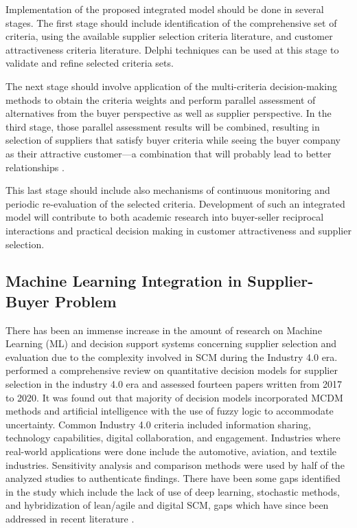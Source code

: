 \documentclass[11pt]{article}
\begin{document}
Implementation of the proposed integrated model should be done in several stages. The first stage should include identification of the comprehensive set of criteria, using the available supplier selection criteria literature, and customer attractiveness criteria literature. Delphi techniques can be used at this stage to validate and refine selected criteria sets.

The next stage should involve application of the multi-criteria decision-making methods to obtain the criteria weights and perform parallel assessment of alternatives from the buyer perspective as well as supplier perspective. In the third stage, those parallel assessment results will be combined, resulting in selection of suppliers that satisfy buyer criteria while seeing the buyer company as their attractive customer---a combination that will probably lead to better relationships \cite{ref14}.

This last stage should include also mechanisms of continuous monitoring and periodic re-evaluation of the selected criteria. Development of such an integrated model will contribute to both academic research into buyer-seller reciprocal interactions and practical decision making in customer attractiveness and supplier selection.

\subsection{Machine Learning Integration in Supplier-Buyer Problem}

There has been an immense increase in the amount of research on Machine Learning (ML) and decision support systems concerning supplier selection and evaluation due to the complexity involved in SCM during the Industry 4.0 era. \cite{ref37} performed a comprehensive review on quantitative decision models for supplier selection in the industry 4.0 era and assessed fourteen papers written from 2017 to 2020. It was found out that majority of decision models incorporated MCDM methods and artificial intelligence with the use of fuzzy logic to accommodate uncertainty. Common Industry 4.0 criteria included information sharing, technology capabilities, digital collaboration, and engagement. Industries where real-world applications were done include the automotive, aviation, and textile industries. Sensitivity analysis and comparison methods were used by half of the analyzed studies to authenticate findings. There have been some gaps identified in the study which include the lack of use of deep learning, stochastic methods, and hybridization of lean/agile and digital SCM, gaps which have since been addressed in recent literature \cite{ref37}.
\end{document}
